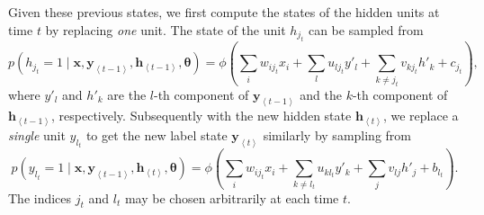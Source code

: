 \documentclass{now}
\newcommand{\qt}[1]{\left<#1\right>}
\newcommand{\vect}[1]{\mathbf{#1}}
\newcommand{\vects}[1]{\boldsymbol{#1}}
\newcommand{\vh}[0]{\vect{h}}
\newcommand{\vx}[0]{\vect{x}}
\newcommand{\vy}[0]{\vect{y}}
\newcommand{\TT}[0]{{\vects{\theta}}}
\begin{document}
Given these previous states, we first compute the states of the hidden units at
time $t$ by replacing \textit{one} unit.  The state of the unit $h_{j_t}$ can be
sampled from
\[
p(h_{j_t} = 1 \mid \vx, \vy_{\qt{t-1}}, \vh_{\qt{t-1}}, \TT) = \phi\left( 
\sum_{i} w_{i{j_t}} x_{i} 
+ \sum_{l} u_{l{j_t}} y'_{l} 
+ \sum_{k \neq {j_t}} v_{k{j_t}} h'_k 
+ c_{j_t} \right),
\]
where $y'_l$ and $h'_k$ are the $l$-th component of $\vy_{\qt{t-1}}$ and the
$k$-th component of $\vh_{\qt{t-1}}$, respectively. Subsequently with the new
hidden state $\vh_{\qt{t}}$, we replace a \textit{single} unit $y_{l_t}$ to get
the new label state $\vy_{\qt{t}}$ similarly by sampling from
\[
p(y_{l_t} = 1 \mid \vx, \vy_{\qt{t-1}}, \vh_{\qt{t}}, \TT) = \phi\left( 
\sum_{i} w_{i{j_t}} x_{i} 
+ \sum_{k \neq l_t} u_{k{l_t}} y'_{k} 
+ \sum_{j} v_{lj} h'_j 
+ b_{l_t} \right).
\]
The indices $j_t$ and $l_t$ may be chosen arbitrarily at each time $t$. 
\end{document}
